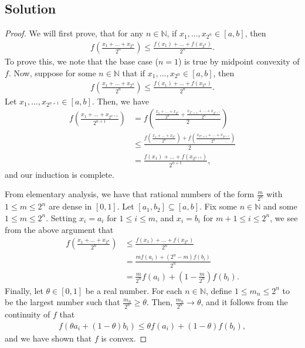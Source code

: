 \documentclass[10pt,a4paper]{article}
\theoremstyle{theorem}
\theoremstyle{definition}
\begin{document}
\subsection*{Solution}
\begin{proof}
We will first prove, that for any $n \in \mathbb{N}$, if $x_1,...,x_{2^n} \in [a, b]$, then
\begin{align*}
f\left( \frac{x_1 + ... + x_{2^n}}{2^n} \right) \leq \frac{f(x_1) + ... + f(x_{2^n})}{2^n}.
\end{align*}
To prove this, we note that the base case ($n=1$) is true by midpoint convexity of $f$. Now, suppose for some $n \in \mathbb{N}$ that if $x_1,...,x_{2^n} \in [a, b]$, then
\begin{align*}
f\left( \frac{x_1 + ... + x_{2^n}}{2^n} \right) \leq \frac{f(x_1) + ... + f(x_{2^n})}{2^n}.
\end{align*}
Let $x_1,...,x_{2^{n+1}} \in [a, b]$. Then, we have
\begin{align*}
f\left( \frac{x_1 + ... + x_{2^{n+1}}}{2^{n+1}} \right) &= f\left( \frac{\frac{x_1 + ... + x_{2^n}}{2^n} + \frac{x_{2^n + 1} + ... + x_{2^{n+1}}}{2^n}}{2} \right)\\
&\leq \frac{f\left( \frac{x_1 + ... + x_{2^n}}{2^n}\right) + f \left( \frac{x_{2^n + 1} + ... + x_{2^{n+1}}}{2^n} \right)}{2}\\
&= \frac{f(x_1) + ... + f(x_{2^{n+1}})}{2^{n+1}},
\end{align*}
and our induction is complete.

From elementary analysis, we have that rational numbers of the form $\frac{m}{2^n}$ with $1 \leq m \leq 2^n$ are dense in $[0, 1]$. Let $[a_1, b_2] \subseteq [a, b]$. Fix some $n \in \mathbb{N}$ and some $1 \leq m \leq 2^n$. Setting $x_i = a_i$ for $1 \leq i \leq m$, and $x_i = b_i$ for $m+1 \leq i \leq 2^n$, we see from the above argument that
\begin{align*}
f\left( \frac{x_1 + ... + x_{2^n}}{2^n} \right) &\leq \frac{f(x_1) + ... + f(x_{2^n})}{2^n}\\
&= \frac{mf(a_i) + (2^n - m)f(b_i)}{2^n}\\
&= \frac{m}{2^n}f(a_i) + (1 - \frac{m}{2^n})f(b_i).
\end{align*}
Finally, let $\theta \in [0, 1]$ be a real number. For each $n \in \mathbb{N}$, define $1 \leq m_n \leq 2^n$ to be the largest number such that $\frac{m_n}{2^n} \geq \theta$. Then, $\frac{m_n}{2^n} \to \theta$, and it follows from the continuity of $f$ that 
\begin{align*}
f(\theta a_i + (1 - \theta)b_i) \leq \theta f(a_i) + (1 - \theta)f(b_i),
\end{align*}
and we have shown that $f$ is convex.
\end{proof}
\end{document}
